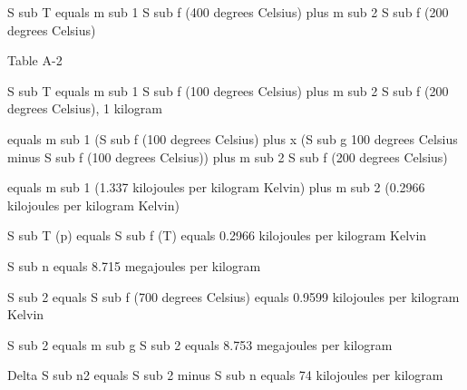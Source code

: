 S sub T equals m sub 1 S sub f (400 degrees Celsius) plus m sub 2 S sub f (200 degrees Celsius)

Table A-2

S sub T equals m sub 1 S sub f (100 degrees Celsius) plus m sub 2 S sub f (200 degrees Celsius), 1 kilogram

equals m sub 1 (S sub f (100 degrees Celsius) plus x (S sub g 100 degrees Celsius minus S sub f (100 degrees Celsius)) plus m sub 2 S sub f (200 degrees Celsius)

equals m sub 1 (1.337 kilojoules per kilogram Kelvin) plus m sub 2 (0.2966 kilojoules per kilogram Kelvin)

S sub T (p) equals S sub f (T) equals 0.2966 kilojoules per kilogram Kelvin

S sub n equals 8.715 megajoules per kilogram

S sub 2 equals S sub f (700 degrees Celsius) equals 0.9599 kilojoules per kilogram Kelvin

S sub 2 equals m sub g S sub 2 equals 8.753 megajoules per kilogram

Delta S sub n2 equals S sub 2 minus S sub n equals 74 kilojoules per kilogram